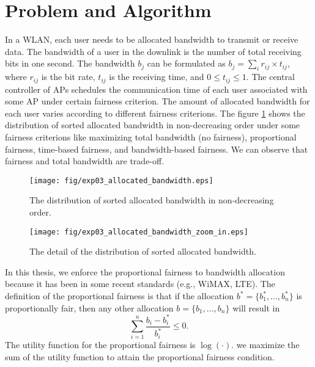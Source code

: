 \section{Problem and Algorithm}
	In a WLAN, each user needs to be allocated bandwidth to transmit or receive data. The bandwidth of a user in the downlink is the number of total receiving bits in one second. The bandwidth $b_j$ can be formulated as $b_j = \sum_{i} r_{ij} \times t_{ij}$, where $r_{ij}$ is the bit rate, $t_{ij}$ is the receiving time, and $ 0 \le t_{ij} \le 1$. The central controller of APs schedules the communication time of each user associated with some AP under certain fairness criterion. The amount of allocated bandwidth for each user varies according to different fairness criterions. The figure \ref{figure:exp03_a_b} shows the distribution of sorted allocated bandwidth in non-decreasing order under some fairness criterions like maximizing total bandwidth (no fairness), proportional fairness, time-based fairness, and bandwidth-based fairness. We can observe that fairness and total bandwidth are trade-off.
	
		\begin{figure}
			\begin{center}
				\texttt{[image: fig/exp03\_allocated\_bandwidth.eps]}
				\caption{The distribution of sorted allocated bandwidth in non-decreasing order.}
				\label{figure:exp03_a_b}
			\end{center}
		\end{figure}

		\begin{figure}
			\begin{center}
				\texttt{[image: fig/exp03\_allocated\_bandwidth\_zoom\_in.eps]}
				\caption{The detail of the distribution of sorted allocated bandwidth.}
				\label{figure:exp03_a_b_z_i}
			\end{center}
		\end{figure}
			
	In this thesis, we enforce the proportional fairness to bandwidth allocation because it has been in some recent standards (e.g., WiMAX, LTE). The definition of the proportional fairness is that if the allocation $b^{*}=\{b_1^*,...,b_n^*\}$ is proportionally fair, then any other allocation $b = \{b_1,...,b_n\}$ will result in
	$$ \sum_{i = 1}^{n} \frac{b_i - b_i^*}{b_i^*} \le 0. $$
	The utility function for the proportional fairness is $\log(\cdot)$. we maximize the sum of the utility function to attain the proportional fairness condition.

